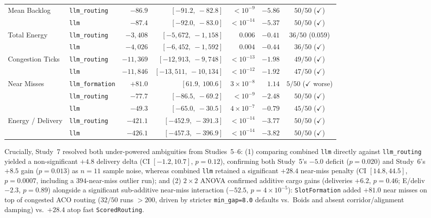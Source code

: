 \documentclass[11pt,a4paper,oneside]{report}
\begin{document}
\begin{table}[H]
{\begin{tabular}{@{}llrrrrc@{}}
Mean Backlog & \texttt{llm\_routing} & $-86.9$ & $[-91.2,\ -82.8]$ & $<10^{-9}$ & $-5.86$ & $50/50$ ($\checkmark$) \\
 & \texttt{llm} & $-87.4$ & $[-92.0,\ -83.0]$ & $<10^{-14}$ & $-5.37$ & $50/50$ ($\checkmark$) \\
\midrule
Total Energy & \texttt{llm\_routing} & $-3{,}408$ & $[-5{,}672,\ -1{,}158]$ & $0.006$ & $-0.41$ & $36/50$ ($0.059$) \\
 & \texttt{llm} & $-4{,}026$ & $[-6{,}452,\ -1{,}592]$ & $0.004$ & $-0.44$ & $36/50$ ($\checkmark$) \\
Congestion Ticks & \texttt{llm\_routing} & $-11{,}369$ & $[-12{,}913,\ -9{,}748]$ & $<10^{-13}$ & $-1.98$ & $49/50$ ($\checkmark$) \\
 & \texttt{llm} & $-11{,}846$ & $[-13{,}511,\ -10{,}134]$ & $<10^{-12}$ & $-1.92$ & $47/50$ ($\checkmark$) \\
\midrule
Near Misses & \texttt{llm\_formation} & $+81.0$ & $[61.9,\ 100.6]$ & $3\times 10^{-8}$ & $1.14$ & $5/50$ ($\checkmark$ worse) \\
 & \texttt{llm\_routing} & $-77.7$ & $[-86.5,\ -69.2]$ & $<10^{-9}$ & $-2.48$ & $50/50$ ($\checkmark$) \\
 & \texttt{llm} & $-49.3$ & $[-65.0,\ -30.5]$ & $4\times 10^{-7}$ & $-0.79$ & $45/50$ ($\checkmark$) \\
\midrule
Energy / Delivery & \texttt{llm\_routing} & $-421.1$ & $[-452.9,\ -391.3]$ & $<10^{-14}$ & $-3.77$ & $50/50$ ($\checkmark$) \\
 & \texttt{llm} & $-426.1$ & $[-457.3,\ -396.9]$ & $<10^{-14}$ & $-3.82$ & $50/50$ ($\checkmark$) \\
\bottomrule
\end{tabular}%
}
\end{table}

Crucially, Study~7 resolved both under-powered ambiguities from Studies~5--6: (1) comparing combined \texttt{llm} directly against \texttt{llm\_routing} yielded a non-significant $+4.8$ delivery delta (CI $[-1.2, 10.7]$, $p=0.12$), confirming both Study~5's $-5.0$ deficit ($p=0.020$) and Study~6's $+8.5$ gain ($p=0.013$) as $n=11$ sample noise, whereas combined \texttt{llm} retained a significant $+28.4$ near-miss penalty (CI $[14.8, 44.5]$, $p=0.0007$, including a $394$-near-miss outlier run); and (2) $2\times 2$ ANOVA confirmed additive cargo gains (deliveries $+6.2$, $p=0.46$; E/deliv $-2.3$, $p=0.89$) alongside a significant sub-additive near-miss interaction ($-52.5$, $p=4\times 10^{-5}$): \texttt{SlotFormation} added $+81.0$ near misses on top of congested ACO routing ($32/50$ runs $>200$, driven by stricter \texttt{min\_gap=8.0} defaults vs.\ Boids and absent corridor/alignment damping) vs.\ $+28.4$ atop fast \texttt{ScoredRouting}.
\end{document}
